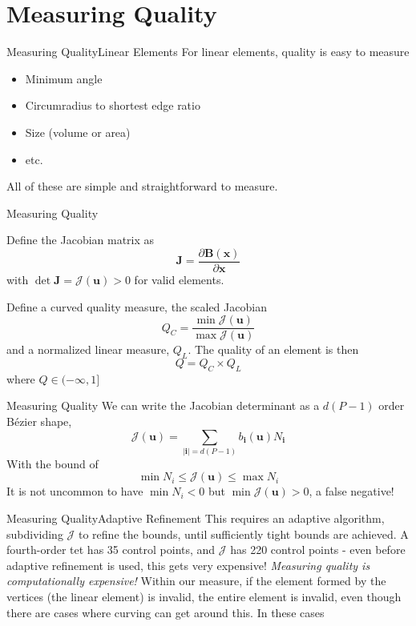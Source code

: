 \documentclass[12pt]{beamer}
\newcommand{\dst}{\displaystyle}
\newcommand{\spa}{\vspace{0.5cm}\newline}
\begin{document}
\section{Measuring Quality}
\begin{frame}{Measuring Quality}{Linear Elements}
For linear elements, quality is easy to measure
\begin{itemize}
\item Minimum angle
\item Circumradius to shortest edge ratio
\item Size (volume or area)
\item etc.
\end{itemize}
All of these are simple and straightforward to measure. 
\end{frame}
\begin{frame}{Measuring Quality}

Define the Jacobian matrix as
\[\mathbf{J} = \frac{\partial \mathbf{B}(\mathbf{x})}{\partial \mathbf{x}}\]
with $\det \mathbf{J} = \mathcal{J}(\mathbf{u}) > 0$ for valid elements.

Define a curved quality measure, the scaled Jacobian
\[
Q_C = \frac{\min \mathcal{J}(\mathbf{u})}{\max \mathcal{J}(\mathbf{u})}
\]
and a normalized linear measure, $Q_L$. The quality of an element is then
\[
Q = Q_C\times Q_L
\]
where $Q \in (-\infty,1]$
\end{frame}
\begin{frame}{Measuring Quality}
We can write the Jacobian determinant as a $d(P-1)$ order B{\'e}zier shape,
\[
\mathcal{J}(\mathbf{u}) = \dst\sum_{|\mathbf{i}|=d(P-1)} b_{\mathbf{i}}(\mathbf{u})N_{\mathbf{i}} \]
With the bound of
\[
\min N_i \leq \mathcal{J}(\mathbf{u}) \leq \max N_i
\]
It is not uncommon to have $\min N_i < 0$ but $\min \mathcal{J}(\mathbf{u}) > 0$, a false negative! \spa
\end{frame}
\begin{frame}{Measuring Quality}{Adaptive Refinement}
This requires an adaptive algorithm, subdividing $\mathcal{J}$ to refine the bounds, until sufficiently tight bounds are achieved. \spa
A fourth-order tet has 35 control points, and $\mathcal{J}$ has 220 control points - even before adaptive refinement is used, this gets very expensive! \spa
\textit{Measuring quality is computationally expensive!} \spa
Within our measure, if the element formed by the vertices (the linear element) is invalid, the entire element is invalid, even though there are cases where curving can get around this. In these cases
\end{frame}
\end{document}
